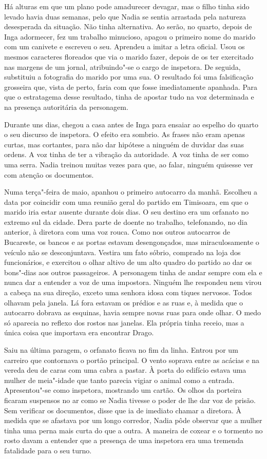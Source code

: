 Há alturas em que um plano pode amadurecer devagar, mas o filho tinha
sido levado havia duas semanas, pelo que Nadia se sentia arrastada pela
natureza desesperada da situação. Não tinha alternativa. Ao serão, no
quarto, depois de Inga adormecer, fez um trabalho minucioso, apagou o
primeiro nome do marido com um canivete e escreveu o seu. Aprendeu a
imitar a letra oficial. Usou os mesmos caracteres floreados que via o
marido fazer, depois de os ter exercitado nas margens de um jornal,
atribuindo"-se o cargo de inspetora. De seguida, substituiu a fotografia do
marido por uma sua. O resultado foi uma falsificação grosseira que,
vista de perto, faria com que fosse imediatamente apanhada. Para que o
estratagema desse resultado, tinha de apostar tudo na voz determinada e
na presença autoritária da personagem.

Durante uns dias, chegou a casa antes de Inga para ensaiar ao espelho do
quarto o seu discurso de inspetora. O efeito era sombrio. As frases não
eram apenas curtas, mas cortantes, para não dar hipótese a ninguém de
duvidar das suas ordens. A voz tinha de ter a vibração da autoridade.
A voz tinha de ser como uma serra. Nadia treinou muitas vezes para que,
ao falar, ninguém quisesse ver com atenção os documentos.

Numa terça"-feira de maio, apanhou o primeiro autocarro da manhã.
Escolheu a data por coincidir com uma reunião geral do partido em
Timisoara, em que o marido iria estar ausente durante dois dias. O seu
destino era um orfanato no extremo sul da cidade. Dera parte de doente
no
trabalho, telefonando, no dia anterior, à diretora com uma voz rouca.
Como nos outros autocarros de Bucareste, os bancos e as portas estavam
desengonçados, mas miraculosamente o veículo não se desconjuntava.
Vestira um fato sóbrio, comprado na loja dos funcionários, e exercitou o
olhar altivo de um alto quadro do partido ao dar os bons"-dias aos outros passageiros. A personagem tinha de andar sempre com ela
e nunca dar a entender a voz de uma impostora. Ninguém lhe respondeu
nem virou a cabeça na sua direção, exceto uma senhora idosa com tiques
nervosos. Todos olhavam pela janela. Lá fora estavam os prédios e as
ruas e, à medida que o autocarro dobrava as esquinas, havia sempre novas
ruas para onde olhar. O medo só aparecia no reflexo dos rostos nas
janelas. Ela própria tinha receio, mas a única coisa que importava era
encontrar Drago.

Saiu na última paragem, o orfanato ficava no fim da linha. Entrou por um
carreiro que contornava o portão principal. O vento soprava entre as
acácias e na vereda deu de caras com uma cabra a pastar. À porta do
edifício estava uma mulher de meia"-idade que tanto parecia vigiar o
animal como a entrada. Apresentou"-se como inspetora, mostrando um
cartão. Os olhos da porteira ficaram suspensos no ar como se Nadia
tivesse o poder de lhe dar voz de prisão. Sem verificar os documentos,
disse que ia de imediato chamar a diretora. À medida que se afastava
por um longo corredor, Nadia pôde observar que a mulher tinha uma perna
mais curta do que a outra. A maneira de coxear e o tormento no rosto
davam a entender que a presença de uma inspetora era uma tremenda
fatalidade para o seu turno.


